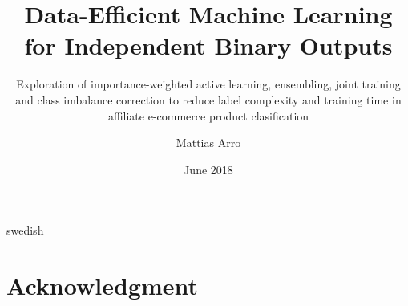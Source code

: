 \documentclass[a4paper,11pt]{kth-mag}
\title{
      Data-Efficient Machine Learning
      \\for Independent Binary Outputs
    }
\subtitle{
      Exploration of importance-weighted active learning, ensembling,
      joint training and class imbalance correction to reduce label complexity
      and training time in affiliate e-commerce product clasification
    }
\author{Mattias Arro}
\date{June 2018}
\begin{document}
\frontmatter


\removepagenumbers
\maketitle
{}

\begin{abstract}

\end{abstract}
\clearpage

\begin{foreignabstract}{swedish}

\end{foreignabstract}
\clearpage

\chapter*{Acknowledgment}


\clearpage
\tableofcontents*

\mainmatter
%

\newpage


\pagestyle{newchap}






\renewcommand\bibname{References}





\appendix
\addappheadtotoc

\end{document}
